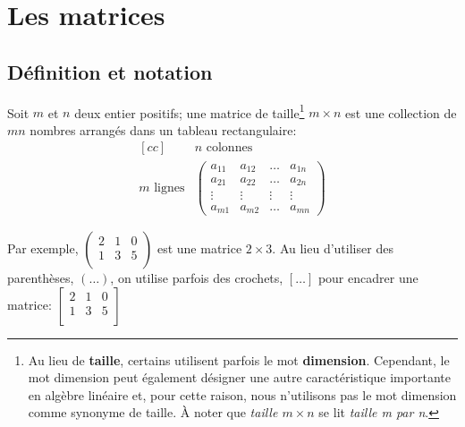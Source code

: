 \section{Les matrices}
\subsection{Définition et notation}


\begin{defini}Soit $m$ et $n$ deux entier positifs; une matrice de taille\footnote{Au lieu de \textbf{taille}, 
certains utilisent parfois le mot \textbf{dimension}.  
Cependant, le mot dimension peut également désigner une autre caractéristique importante en algèbre linéaire et,
pour cette raison, nous n'utilisons pas le mot dimension comme synonyme de taille. 
À noter que \textit{taille $m\times n$} se lit \textit{taille m par n}.} $m\times n$
est une collection de $mn$ nombres arrangés dans un tableau rectangulaire:
\[
\begin{matrix}[cc]
&\text{$n$ colonnes} \\
\text{$m$ lignes}& \begin{pmatrix}
        a_{11} & a_{12} & \ldots & a_{1n}\\
        a_{21} & a_{22} & \ldots & a_{2n}\\
        \vdots & \vdots & \vdots & \vdots \\
        a_{m1} & a_{m2} & \ldots & a_{mn}
        \end{pmatrix}
  \end{matrix}
\]
\end{defini}
Par exemple, $\begin{pmatrix} 2 & 1 & 0 \\ 1 & 3 & 5 \\ \end{pmatrix}$
  est une matrice $2 \times 3$.  Au lieu d'utiliser des parenthèses, $(\ldots)$,
  on utilise parfois des crochets, $[\ldots]$ pour encadrer une matrice:
  $\begin{bmatrix} 2 & 1 & 0 \\ 1 & 3 & 5 \\ \end{bmatrix}$

